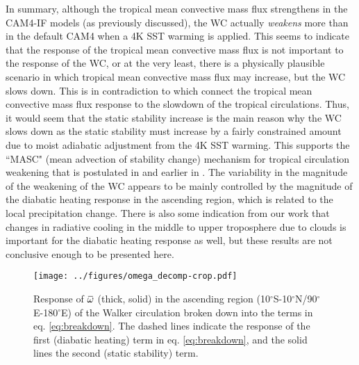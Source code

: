 \documentclass[letterpaper,12pt,titlepage,oneside,final]{book}
\newcommand{\overbar}[1]{\mkern 1.5mu\overline{\mkern-1.5mu#1\mkern-1.5mu}\mkern 1.5mu}
\begin{document}
In summary, although the tropical mean convective mass flux strengthens in the CAM4-IF models (as previously discussed), the WC actually \textit{weakens} more than in the default CAM4 when a 4K SST warming is applied. This seems to indicate that the response of the tropical mean convective mass flux is not important to the response of the WC, or at the very least, there is a physically plausible scenario in which tropical mean convective mass flux may increase, but the WC slows down. This is in contradiction to \citep{held_robust_2006,vecchi_global_2007} which connect the tropical mean convective mass flux response to the slowdown of the tropical circulations. Thus, it would seem that the static stability increase is the main reason why the WC slows down as the static stability must increase by a fairly constrained amount due to moist adiabatic adjustment from the 4K SST warming. This supports the ``MASC" (mean advection of stability change) mechanism for tropical circulation weakening that is postulated in \citep{ma_mechanisms_2011} and earlier in \citep{knutson_time-mean_1995}. The variability in the magnitude of the weakening of the WC appears to be mainly controlled by the magnitude of the diabatic heating response in the ascending region, which is related to the local precipitation change. There is also some indication from our work that changes in radiative cooling in the middle to upper troposphere due to clouds is important for the diabatic heating response as well, but these results are not conclusive enough to be presented here.

\begin{figure}[H]
\centering
\noindent\texttt{[image: ../figures/omega\_decomp-crop.pdf]}\hfill
\caption{\footnotesize \footnotesize Response of $\overbar{\omega}$ (thick, solid) in the ascending region (10$^{\circ}$S-10$^{\circ}$N/90$^{\circ}$E-180$^{\circ}$E) of the Walker circulation broken down into the terms in eq. \ref{eq:breakdown}. The dashed lines indicate the response of the first (diabatic heating) term in eq. \ref{eq:breakdown}, and the solid lines the second (static stability) term. }
\label{fig:omegdecomp}
\end{figure}
\end{document}
